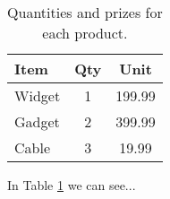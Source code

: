 \documentclass{article}
\begin{document}
\begin{table}
\centering
\begin{tabular}{l|cc}
Item   & Qty & Unit \\\hline
Widget & 1   & 199.99  \\
Gadget & 2   & 399.99  \\
Cable  & 3   & 19.99   \\
\end{tabular}
\caption{\label{tab:prizes} Quantities 
and prizes  for each product.}
\end{table}

In Table \ref{tab:prizes} 
we can see...
\end{document}
